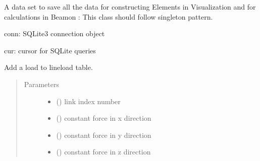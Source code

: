 \documentclass[letterpaper,10pt,english]{sphinxmanual}
\begin{document}
\begin{fulllineitems}
\label{\detokenize{api:beamon.database.Database}}
A data set to save all the data for constructing Elements in Visualization and for calculations in Beamon
: This class should follow singleton pattern.

conn: SQLite3 connection object

cur: cursor for SQLite queries

\begin{fulllineitems}
\label{\detokenize{api:beamon.database.Database.add_lineload}}
Add a load to lineload table.
\begin{quote}\begin{description}
\item[{Parameters}] \leavevmode\begin{itemize}
\item {} 
 () \textendash{} link index number

\item {} 
 () \textendash{} constant force in x direction

\item {} 
 () \textendash{} constant force in y direction

\item {} 
 () \textendash{} constant force in z direction


\end{itemize}
\end{description}
\end{quote}
\end{fulllineitems}
\end{fulllineitems}
\end{document}

